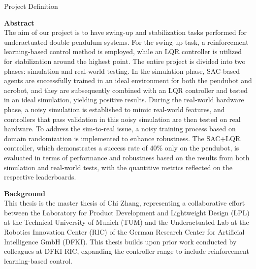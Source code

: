 
\newpage

\fontsize{18pt}{20pt}\selectfont

\vspace{25.3mm}
Project Definition

\normalsize\selectfont
\vspace{13.2mm}
\textbf{Abstract}  \medskip \\
The aim of our project is to have swing-up and stabilization tasks performed for underactuated double pendulum systems. For the swing-up task, a reinforcement learning-based control method is employed, while an LQR controller is utilized for stabilization around the highest point. The entire project is divided into two phases: simulation and real-world testing. In the simulation phase, SAC-based agents are successfully trained in an ideal environment for both the pendubot and acrobot, and they are subsequently combined with an LQR controller and tested in an ideal simulation, yielding positive results. During the real-world hardware phase, a noisy simulation is established to mimic real-world features, and controllers that pass validation in this noisy simulation are then tested on real hardware. To address the sim-to-real issue, a noisy training process based on domain randomization is implemented to enhance robustness. The SAC+LQR controller, which demonstrates a success rate of 40\% only on the pendubot, is evaluated in terms of performance and robustness based on the results from both simulation and real-world tests, with the quantitive metrics reflected on the respective leaderboards.



\par \bigskip


\normalsize\selectfont
\textbf{Background} \medskip \\
This thesis is the master thesis of Chi Zhang, representing a collaborative effort between the Laboratory for Product Development and Lightweight Design (LPL) at the Technical University of Munich (TUM) and the Underactuated Lab at the Robotics Innovation Center (RIC) of the German Research Center for Artificial Intelligence GmbH (DFKI). This thesis builds upon prior work conducted by colleagues at DFKI RIC, expanding the controller range to include reinforcement learning-based control.

